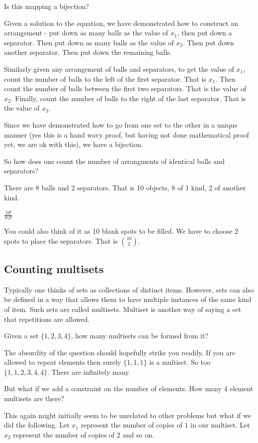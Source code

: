 \documentclass[12pt]{article}
\begin{document}
Is this mapping a bijection? 

Given a solution to the equation, we have demonstrated how to construct an arrangement - put down as many balls as the value of $x_1$, then put down a separator. Then put down as many balls as the value of $x_2$. Then put down another separator. Then put down the remaining balls.

Similarly given any arrangement of balls and separators, to get the value of $x_1$, count the number of balls to the left of the first separator. That is $x_1$. Then count the number of balls between the first two separators. That is the value of $x_2$. Finally, count the number of balls to the right of the last separator. That is the value of $x_3$.

Since we have demonstrated how to go from one set to the other in a unique manner (yes this is a hand wavy proof, but having not done mathematical proof yet, we are ok with this), we have a bijection.

So how does one count the number of arrangments of identical balls and separators?

There are 8 balls and 2 separators. That is 10 objects, 8 of 1 kind, 2 of another kind.

$\frac{10!}{8!2!}$

You could also think of it as 10 blank spots to be filled. We have to choose 2 spots to place the separators. That is $\binom{10}{2}$.

\subsection*{Counting multisets}
Typically one thinks of sets as collections of distinct items. However, sets can also be defined in a way that allows them to have multiple instances of the same kind of item. Such sets are called multisets. Multiset is another way of saying a set that repetitions  are allowed.

Given a set $\{1,2,3,4\}$, how many multisets can be formed from it?

The absurdity of the question should hopefully strike you readily. If you are allowed to repeat elements then surely $\{1,1,1\}$ is a multiset. So too $\{1,1,2,3,4,4\}$. There are infinitely many.

But what if we add a constraint on the number of elements. How many $4$ element multisets are there?

This again might initially seem to be unrelated to other problems but what if we did the following. Let $x_1$ represent the number of copies of $1$ in our multiset. Let $x_2$ represent the number of copies of $2$ and so on.
\end{document}
